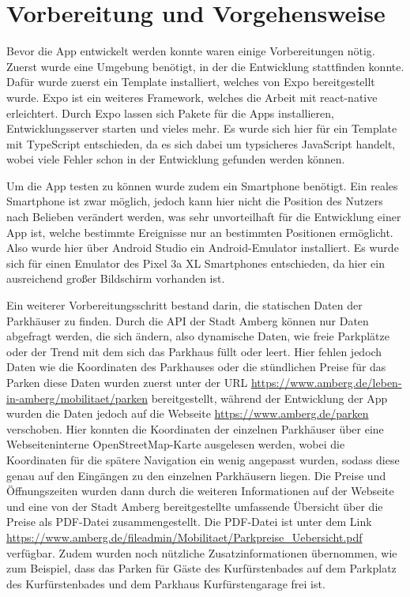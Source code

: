 \chapter{Vorbereitung und Vorgehensweise}
\label{chap:2}

Bevor die App entwickelt werden konnte waren einige Vorbereitungen nötig. Zuerst wurde eine Umgebung benötigt, in der die Entwicklung stattfinden konnte. Dafür wurde zuerst ein Template installiert, welches von Expo bereitgestellt wurde\cite{expo}. Expo ist ein weiteres Framework, welches die Arbeit mit react-native erleichtert. Durch Expo lassen sich Pakete für die Apps installieren, Entwicklungsserver starten und vieles mehr. Es wurde sich hier für ein Template mit TypeScript entschieden, da es sich dabei um typsicheres JavaScript handelt, wobei viele Fehler schon in der Entwicklung gefunden werden können.

Um die App testen zu können wurde zudem ein Smartphone benötigt. Ein reales Smartphone ist zwar möglich, jedoch kann hier nicht die Position des Nutzers nach Belieben verändert werden, was sehr unvorteilhaft für die Entwicklung einer App ist, welche bestimmte Ereignisse nur an bestimmten Positionen ermöglicht. Also wurde hier über Android Studio ein Android-Emulator installiert. Es wurde sich für einen Emulator des Pixel 3a XL Smartphones entschieden, da hier ein ausreichend großer Bildschirm vorhanden ist.

Ein weiterer Vorbereitungsschritt bestand darin, die statischen Daten der Parkhäuser zu finden. Durch die API der Stadt Amberg können nur Daten abgefragt werden, die sich ändern, also dynamische Daten, wie freie Parkplätze oder der Trend mit dem sich das Parkhaus füllt oder leert. Hier fehlen jedoch Daten wie die Koordinaten des Parkhauses oder die stündlichen Preise für das Parken diese Daten wurden zuerst unter der URL \url{https://www.amberg.de/leben-in-amberg/mobilitaet/parken} bereitgestellt, während der Entwicklung der App wurden die Daten jedoch auf die Webseite \url{https://www.amberg.de/parken} verschoben. Hier konnten die Koordinaten der einzelnen Parkhäuser über eine Webseiteninterne OpenStreetMap-Karte ausgelesen werden, wobei die Koordinaten für die spätere Navigation ein wenig angepasst wurden, sodass diese genau auf den Eingängen zu den einzelnen Parkhäusern liegen. Die Preise und Öffnungszeiten wurden dann durch die weiteren Informationen auf der Webseite und eine von der Stadt Amberg bereitgestellte umfassende Übersicht über die Preise als PDF-Datei zusammengestellt. Die PDF-Datei ist unter dem Link \url{https://www.amberg.de/fileadmin/Mobilitaet/Parkpreise_Uebersicht.pdf} verfügbar. Zudem wurden noch nützliche Zusatzinformationen übernommen, wie zum Beispiel, dass das Parken für Gäste des Kurfürstenbades auf dem Parkplatz des Kurfürstenbades und dem Parkhaus Kurfürstengarage frei ist.

